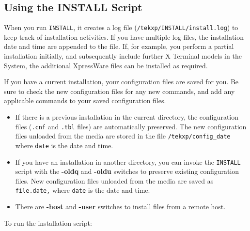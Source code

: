 \subsection {Using the INSTALL Script}

When you run {\tt INSTALL}, it creates a log file
({\tt /tekxp/INSTALL/install.log}) to keep track of installation activities.
If you have multiple log files, the installation date and time are appended to
the file. If, for example, you perform a partial installation initially, and
subsequently include further X Terminal models in the System, the additional
XpressWare files can be installed as required.

If you have a current installation, your configuration files are saved for you.
Be sure to check the new configuration files for any new commands, and add any
applicable commands to your saved configuration files.

\begin {itemize}

\item If there is a previous installation in the current directory, the
configuration files ({\tt .cnf} and {\tt .tbl} files) are automatically
preserved. The new configuration files unloaded from the media are stored in
the file {\tt /tekxp/config\_date} where {\tt date} is the date and time.

\item If you have an installation in another directory, you can invoke the
{\tt INSTALL} script with the {\bf -oldq} and {\bf -oldu} switches to preserve
existing configuration files. New configuration files unloaded from the media
are saved as {\tt file.date,} where {\tt date} is the date and time.

\item There are {\bf -host} and {\bf -user} switches to install files from a
remote host.

\end {itemize}

To run the installation script:

